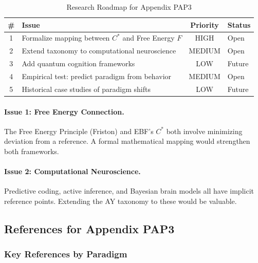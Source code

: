 \begin{table}[htbp]
\centering
\caption{Research Roadmap for Appendix PAP3}
\label{tab:AY-roadmap}
\renewcommand{\arraystretch}{1.3}
\begin{tabular}{@{}clcl@{}}
\toprule
\textbf{\#} & \textbf{Issue} & \textbf{Priority} & \textbf{Status} \\
\midrule
1 & Formalize mapping between $C^*$ and Free Energy $F$ & HIGH & Open \\
2 & Extend taxonomy to computational neuroscience & MEDIUM & Open \\
3 & Add quantum cognition frameworks & LOW & Future \\
4 & Empirical test: predict paradigm from behavior & MEDIUM & Open \\
5 & Historical case studies of paradigm shifts & LOW & Future \\
\bottomrule
\end{tabular}
\end{table}

\paragraph{Issue 1: Free Energy Connection.}
The Free Energy Principle (Friston) and EBF's $C^*$ both involve minimizing
deviation from a reference. A formal mathematical mapping would strengthen
both frameworks.

\paragraph{Issue 2: Computational Neuroscience.}
Predictive coding, active inference, and Bayesian brain models all have
implicit reference points. Extending the AY taxonomy to these would be valuable.


\subsection{References for Appendix PAP3}
\label{sec:AY-references}

\subsubsection{Key References by Paradigm}

